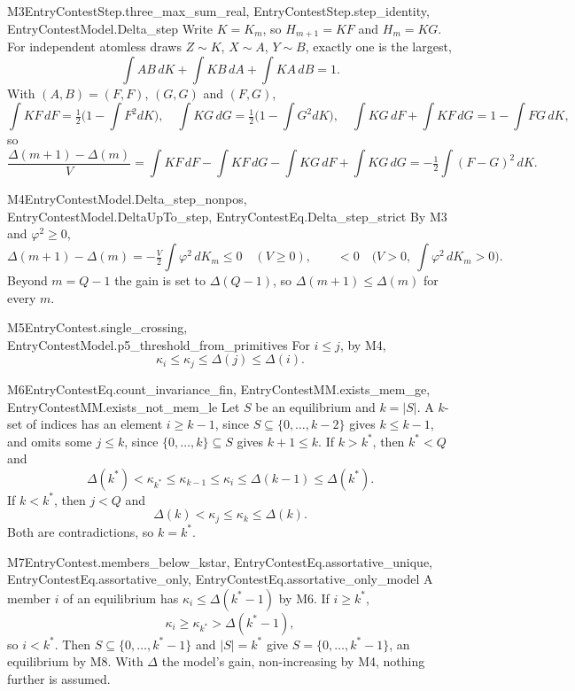 \begin{mproof}{M3}{EntryContestStep.three_max_sum_real, EntryContestStep.step_identity, EntryContestModel.Delta_step}
Write $K=K_m$, so $H_{m+1}=KF$ and $H_m=KG$. For independent atomless draws
$Z\sim K$, $X\sim A$, $Y\sim B$, exactly one is the largest,
\[
  \int AB\,dK+\int KB\,dA+\int KA\,dB=1 .
\]
With $(A,B)=(F,F)$, $(G,G)$ and $(F,G)$,
\[
  \int KF\,dF=\tfrac12\Big(1-\int F^2dK\Big),\quad
  \int KG\,dG=\tfrac12\Big(1-\int G^2dK\Big),\quad
  \int KG\,dF+\int KF\,dG=1-\int FG\,dK ,
\]
so
\[
  \frac{\Delta(m{+}1)-\Delta(m)}{V}
  =\int KF\,dF-\int KF\,dG-\int KG\,dF+\int KG\,dG
  =-\tfrac12\int (F-G)^2\,dK .
\]
\end{mproof}

\begin{mproof}{M4}{EntryContestModel.Delta_step_nonpos, EntryContestModel.DeltaUpTo_step, EntryContestEq.Delta_step_strict}
By M3 and $\varphi^2\ge0$,
\[
  \Delta(m{+}1)-\Delta(m)=-\tfrac V2\int\varphi^2\,dK_m\le0 \quad (V\ge0),
  \qquad <0 \quad \Big(V>0,\ \int\varphi^2\,dK_m>0\Big).
\]
Beyond $m=Q-1$ the gain is set to $\Delta(Q-1)$, so $\Delta(m{+}1)\le\Delta(m)$
for every $m$.
\end{mproof}

\begin{mproof}{M5}{EntryContest.single_crossing, EntryContestModel.p5_threshold_from_primitives}
For $i\le j$, by M4,
\[
  \kappa_i\le\kappa_j\le\Delta(j)\le\Delta(i).
\]
\end{mproof}

\begin{mproof}{M6}{EntryContestEq.count_invariance_fin, EntryContestMM.exists_mem_ge, EntryContestMM.exists_not_mem_le}
Let $S$ be an equilibrium and $k=|S|$. A $k$-set of indices has an element
$i\ge k-1$, since
$S\subseteq\{0,\dots,k-2\}$ gives $k\le k-1$, and omits some $j\le k$, since
$\{0,\dots,k\}\subseteq S$ gives $k+1\le k$. If $k>k^*$, then $k^*<Q$ and
\[
  \Delta(k^*)<\kappa_{k^*}\le\kappa_{k-1}\le\kappa_i\le\Delta(k-1)\le\Delta(k^*).
\]
If $k<k^*$, then $j<Q$ and
\[
  \Delta(k)<\kappa_j\le\kappa_k\le\Delta(k).
\]
Both are contradictions, so $k=k^*$.
\end{mproof}

\begin{mproof}{M7}{EntryContest.members_below_kstar, EntryContestEq.assortative_unique, EntryContestEq.assortative_only, EntryContestEq.assortative_only_model}
A member $i$ of an equilibrium has $\kappa_i\le\Delta(k^*-1)$ by M6. If $i\ge k^*$,
\[
  \kappa_i\ge\kappa_{k^*}>\Delta(k^*-1),
\]
so $i<k^*$. Then $S\subseteq\{0,\dots,k^*-1\}$ and $|S|=k^*$ give
$S=\{0,\dots,k^*-1\}$, an equilibrium by M8. With $\Delta$ the model's gain,
non-increasing by M4, nothing further is assumed.
\end{mproof}

